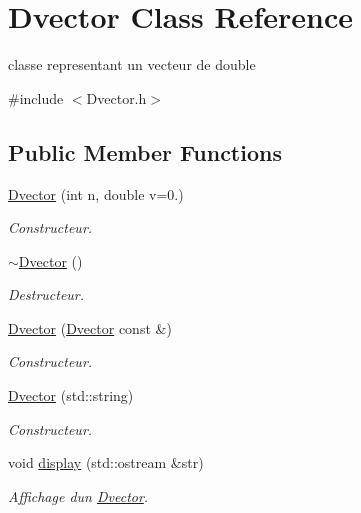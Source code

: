 \hypertarget{class_dvector}{}\section{Dvector Class Reference}
\label{class_dvector}


classe representant un vecteur de double  




{\ttfamily \#include $<$Dvector.\+h$>$}

\subsection*{Public Member Functions}
\begin{DoxyCompactItemize}
\item 
\hyperlink{class_dvector_a9eda56cb2ca707d915295defb72869c7}{Dvector} (int n, double v=0.)
\begin{DoxyCompactList}\small\item\em Constructeur. \end{DoxyCompactList}\item 
\hyperlink{class_dvector_a3156d0776c5da1a15685970200ec6b96}{$\sim$\+Dvector} ()
\begin{DoxyCompactList}\small\item\em Destructeur. \end{DoxyCompactList}\item 
\hyperlink{class_dvector_a7040a6dc6feb57dd2c5b7033c00e5de5}{Dvector} (\hyperlink{class_dvector}{Dvector} const \&)
\begin{DoxyCompactList}\small\item\em Constructeur. \end{DoxyCompactList}\item 
\hyperlink{class_dvector_ab7046502bfc8889846cfdcb4499398cb}{Dvector} (std\+::string)
\begin{DoxyCompactList}\small\item\em Constructeur. \end{DoxyCompactList}\item 
\hypertarget{class_dvector_af66e4bdf60171463c01eea1039eecdb1}{}\label{class_dvector_af66e4bdf60171463c01eea1039eecdb1} 
void \hyperlink{class_dvector_af66e4bdf60171463c01eea1039eecdb1}{display} (std\+::ostream \&str)
\begin{DoxyCompactList}\small\item\em Affichage d\textquotesingle{}un \hyperlink{class_dvector}{Dvector}. \end{DoxyCompactList}\item 

\end{DoxyCompactItemize}
